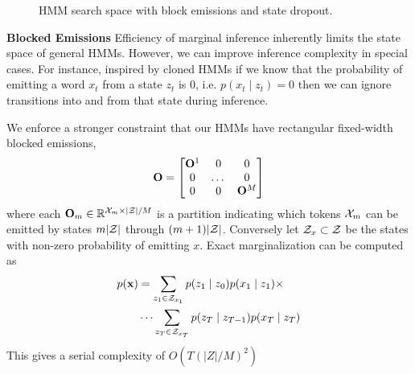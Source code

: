 \documentclass[11pt,a4paper]{article}
\begin{document}
\begin{figure}[!t]
\begin{center}

\end{center}
\caption{
\label{fig:trellis}
HMM search space with block emissions and state dropout.
}
\end{figure}



\noindent
\textbf{Blocked Emissions} Efficiency of marginal inference inherently limits 
the state space of general HMMs.
However, we can improve inference complexity in special cases.
For instance, inspired by cloned HMMs \citep{dedieu2019learning} if we know that the probability of emitting a word $x_t$ from a state $z_t$ is 0,
i.e. $p(x_t \mid z_t) = 0$  then we can ignore transitions into and from that state during inference. 

We enforce a stronger constraint that our HMMs have rectangular fixed-width blocked emissions,
\[\mathbf{O} = \begin{bmatrix} \mathbf{O}^1 & 0 & 0 \\ 0 & $\dots$ & 0 \\ 0 & 0 & \mathbf{O}^M \\
\end{bmatrix}\]
where each $\mathbf{O}_m \in \mathbb{R}^{ {\cal X}_m \times |{\cal Z}|/M}$ is a partition indicating which tokens ${\cal X}_m$ can be emitted by states $m|{\cal Z}|$ through $(m+1)|{\cal Z}|$. Conversely let $\mathcal{Z}_x \subset {\cal Z}$ be the states with non-zero probability of emitting $x$. Exact marginalization can be computed as 
\begin{equation}
\label{eqn:sparse_marginalization}
\begin{aligned}
p(\mathbf{x}) &= \sum_{z_1 \in \mathcal{Z}_{x_1}} p(z_1\mid z_0)p(x_1 \mid z_1) \times\\
    &\cdots
    \sum_{z_T \in \mathcal{Z}_{x_T}} p(z_T \mid z_{T-1})p(x_T \mid z_T)
\end{aligned}
\end{equation}
This gives a serial complexity of $O(T(|Z|/M)^2)$
\end{document}
